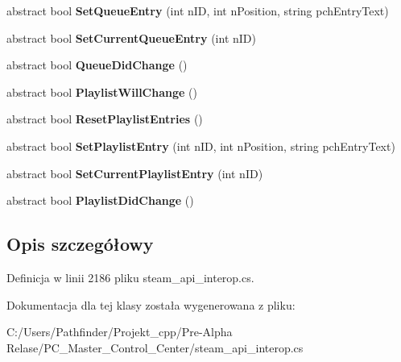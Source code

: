 \begin{DoxyCompactItemize}
\mbox{\label{class_valve_1_1_steamworks_1_1_i_steam_music_remote_a499950b710248c266382b975aaf8bf58}} 
abstract bool {\bfseries Set\+Queue\+Entry} (int n\+ID, int n\+Position, string pch\+Entry\+Text)
\item 
\mbox{\label{class_valve_1_1_steamworks_1_1_i_steam_music_remote_ab594279378f8a49656ce0dfb01c2cf72}} 
abstract bool {\bfseries Set\+Current\+Queue\+Entry} (int n\+ID)
\item 
\mbox{\label{class_valve_1_1_steamworks_1_1_i_steam_music_remote_abaf9c0add7d0531f50f929bb0da8538d}} 
abstract bool {\bfseries Queue\+Did\+Change} ()
\item 
\mbox{\label{class_valve_1_1_steamworks_1_1_i_steam_music_remote_a78f78dffdd32714cf2dc930772c73e36}} 
abstract bool {\bfseries Playlist\+Will\+Change} ()
\item 
\mbox{\label{class_valve_1_1_steamworks_1_1_i_steam_music_remote_af810cf26c9d925c44199a43e1c9c438e}} 
abstract bool {\bfseries Reset\+Playlist\+Entries} ()
\item 
\mbox{\label{class_valve_1_1_steamworks_1_1_i_steam_music_remote_abfdee10d57a03f30268eac6ce44d9474}} 
abstract bool {\bfseries Set\+Playlist\+Entry} (int n\+ID, int n\+Position, string pch\+Entry\+Text)
\item 
\mbox{\label{class_valve_1_1_steamworks_1_1_i_steam_music_remote_a61baed17d3604d6b3202c1b34fb07918}} 
abstract bool {\bfseries Set\+Current\+Playlist\+Entry} (int n\+ID)
\item 
\mbox{\label{class_valve_1_1_steamworks_1_1_i_steam_music_remote_a74bad084d7f44266cad86872a711d6d2}} 
abstract bool {\bfseries Playlist\+Did\+Change} ()
\end{DoxyCompactItemize}


\subsection{Opis szczegółowy}


Definicja w linii 2186 pliku steam\+\_\+api\+\_\+interop.\+cs.



Dokumentacja dla tej klasy została wygenerowana z pliku\+:\begin{DoxyCompactItemize}
\item 
C\+:/\+Users/\+Pathfinder/\+Projekt\+\_\+cpp/\+Pre-\/\+Alpha Relase/\+P\+C\+\_\+\+Master\+\_\+\+Control\+\_\+\+Center/steam\+\_\+api\+\_\+interop.\+cs\end{DoxyCompactItemize}
